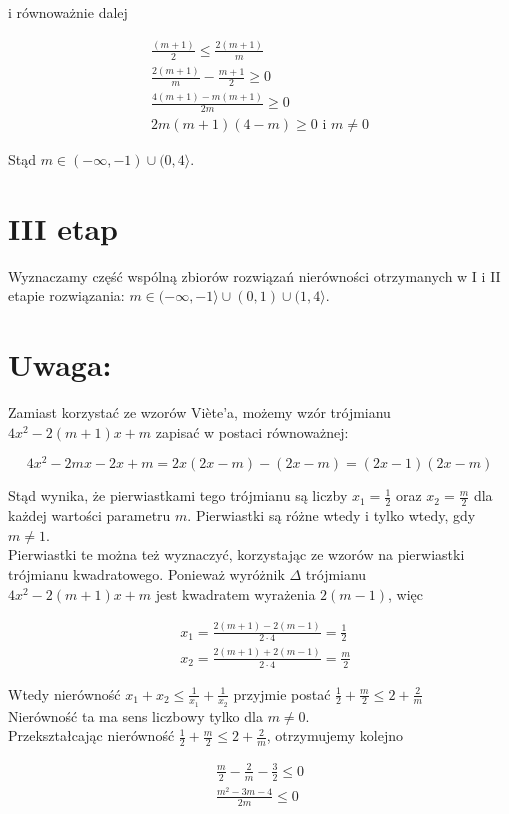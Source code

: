 \documentclass[10pt]{article}
\begin{document}
i równoważnie dalej

$$
\begin{gathered}
\frac{(m+1)}{2} \leq \frac{2(m+1)}{m} \\
\frac{2(m+1)}{m}-\frac{m+1}{2} \geq 0 \\
\frac{4(m+1)-m(m+1)}{2 m} \geq 0 \\
2 m(m+1)(4-m) \geq 0 \text { i } m \neq 0
\end{gathered}
$$

Stąd $m \in(-\infty,-1) \cup(0,4\rangle$.

\section*{III etap}
Wyznaczamy część wspólną zbiorów rozwiązań nierówności otrzymanych w I i II etapie rozwiązania: $m \in(-\infty,-1\rangle \cup(0,1) \cup(1,4\rangle$.

\section*{Uwaga:}
Zamiast korzystać ze wzorów Viète'a, możemy wzór trójmianu $4 x^{2}-2(m+1) x+m$ zapisać w postaci równoważnej:

$$
4 x^{2}-2 m x-2 x+m=2 x(2 x-m)-(2 x-m)=(2 x-1)(2 x-m)
$$

Stąd wynika, że pierwiastkami tego trójmianu są liczby $x_{1}=\frac{1}{2}$ oraz $x_{2}=\frac{m}{2}$ dla każdej wartości parametru $m$. Pierwiastki są różne wtedy i tylko wtedy, gdy $m \neq 1$.\\
Pierwiastki te można też wyznaczyć, korzystając ze wzorów na pierwiastki trójmianu kwadratowego. Ponieważ wyróżnik $\Delta$ trójmianu $4 x^{2}-2(m+1) x+m$ jest kwadratem wyrażenia $2(m-1)$, więc

$$
\begin{aligned}
& x_{1}=\frac{2(m+1)-2(m-1)}{2 \cdot 4}=\frac{1}{2} \\
& x_{2}=\frac{2(m+1)+2(m-1)}{2 \cdot 4}=\frac{m}{2}
\end{aligned}
$$

Wtedy nierówność $x_{1}+x_{2} \leq \frac{1}{x_{1}}+\frac{1}{x_{2}}$ przyjmie postać $\frac{1}{2}+\frac{m}{2} \leq 2+\frac{2}{m}$\\
Nierówność ta ma sens liczbowy tylko dla $m \neq 0$.\\
Przekształcając nierówność $\frac{1}{2}+\frac{m}{2} \leq 2+\frac{2}{m}$, otrzymujemy kolejno

$$
\begin{gathered}
\frac{m}{2}-\frac{2}{m}-\frac{3}{2} \leq 0 \\
\frac{m^{2}-3 m-4}{2 m} \leq 0
\end{gathered}
$$
\end{document}
